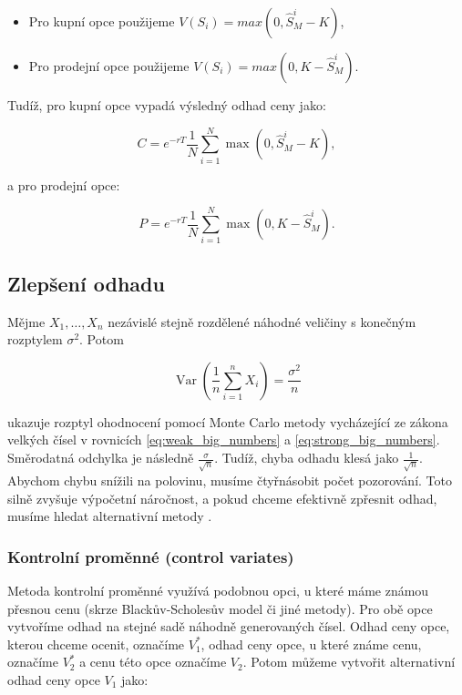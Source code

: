 \documentclass[male,czech,api_bc]{kitheses}
\begin{document}
  \begin{itemize}
    \item Pro kupní opce použijeme $V(S_i) = max(0, \hat{S}^i_M - K)$,
    \item Pro prodejní opce použijeme $V(S_i) = max(0, K - \hat{S}^i_M)$.
  \end{itemize}

  Tudíž, pro kupní opce vypadá výsledný odhad ceny jako:

  \begin{equation}
    C = e^{-rT} \frac{1}{N} \sum_{i=1}^N \max(0, \hat{S}^i_M - K),
  \end{equation}

  a pro prodejní opce:

  \begin{equation}
    P = e^{-rT} \frac{1}{N} \sum_{i=1}^N \max(0, K - \hat{S}^i_M).
  \end{equation}

  \parencites[kapitola~24.4]{McDonald2013}

  \subsection{Zlepšení odhadu}

  Mějme $X_1, \dots, X_n$ nezávislé stejně rozdělené náhodné veličiny s konečným rozptylem $\sigma^2$. Potom

    \begin{equation}
      \operatorname{Var}\!\left( \frac{1}{n}\sum_{i=1}^n X_i \right) = \frac{\sigma^2}{n}
    \end{equation}

    ukazuje rozptyl ohodnocení pomocí Monte Carlo metody vycházející ze zákona velkých čísel v rovnicích \eqref{eq:weak_big_numbers} a \eqref{eq:strong_big_numbers}. Směrodatná odchylka je následně $\frac{\sigma}{\sqrt{n}}$. Tudíž, chyba odhadu klesá jako $\frac{1}{\sqrt{n}}$. Abychom chybu snížili na polovinu, musíme čtyřnásobit počet pozorování. Toto silně zvyšuje výpočetní náročnost, a pokud chceme efektivně zpřesnit odhad, musíme hledat alternativní metody \parencites{Boyle1986}.

  \subsubsection{Kontrolní proměnné (control variates)}

  Metoda kontrolní proměnné využívá podobnou opci, u které máme známou přesnou cenu (skrze Blackův-Scholesův model či jiné metody).
  Pro obě opce vytvoříme odhad na stejné sadě náhodně generovaných čísel. Odhad ceny opce, kterou chceme ocenit, označíme $V_1^*$, odhad ceny opce, u které známe cenu, označíme $V_2^*$ a cenu této opce označíme $V_2$. Potom můžeme vytvořit alternativní odhad ceny opce $V_1$ jako:
\end{document}

